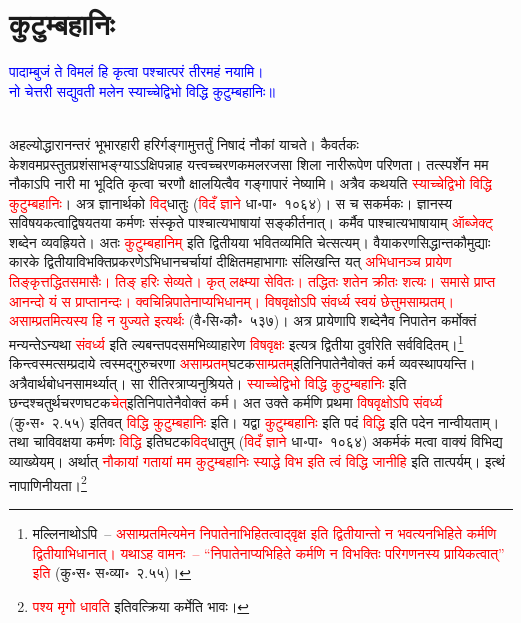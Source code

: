 \section[कुटुम्बहानिः]{कुटुम्बहानिः}
\centering\textcolor{blue}{पादाम्बुजं ते विमलं हि कृत्वा पश्चात्परं तीरमहं नयामि।\nopagebreak\\
नो चेत्तरी सद्युवती मलेन स्याच्चेद्विभो विद्धि कुटुम्बहानिः॥}\nopagebreak\\
\\
\begin{sloppypar}\justifying\noindent\hspace{10mm} अहल्योद्धारानन्तरं भू\-भार\-हारी हरिर्गङ्गामुत्तर्तुं निषादं नौकां याचते। कैवर्तकः केशवमप्रस्तुत\-प्रशंसाभङ्ग्याऽऽक्षिपन्नाह यत्त्वच्चरण\-कमल\-रजसा शिला नारी\-रूपेण परिणता। तत्स्पर्शेन मम नौकाऽपि नारी मा भूदिति कृत्वा चरणौ क्षालयित्वैव गङ्गा\-पारं नेष्यामि। अत्रैव कथयति \textcolor{red}{स्याच्चेद्विभो विद्धि कुटुम्ब\-हानिः}। अत्र ज्ञानार्थको \textcolor{red}{विद्‌}\-धातुः (\textcolor{red}{विदँ ज्ञाने} धा॰पा॰~१०६४)। स च सकर्मकः। ज्ञानस्य सविषयकत्वाद्विषयतया कर्मणः संस्कृते पाश्चात्य\-भाषायां सङ्कीर्तनात्। कर्मैव पाश्चात्य\-भाषायाम् \textcolor{red}{ऑब्जेक्ट्‌} शब्देन व्यवह्रियते। अतः \textcolor{red}{कुटुम्बहानिम्‌} इति द्वितीयया भवितव्यमिति चेत्सत्यम्। वैयाकरण\-सिद्धान्त\-कौमुद्याः कारके द्वितीया\-विभक्ति\-प्रकरणेऽभिधान\-चर्चायां दीक्षित\-महाभागाः संलिखन्ति यत् \textcolor{red}{अभिधानञ्च प्रायेण तिङ्कृत्तद्धित\-समासैः। तिङ् हरिः सेव्यते। कृत् लक्ष्म्या सेवितः। तद्धितः शतेन क्रीतः शत्यः। समासे प्राप्त आनन्दो यं स प्राप्तानन्दः। क्वचिन्निपातेनाप्यभिधानम्। विष\-वृक्षोऽपि संवर्ध्य स्वयं छेत्तुमसाम्प्रतम्। असाम्प्रतमित्यस्य हि न युज्यते इत्यर्थः} (वै॰सि॰कौ॰~५३७)। अत्र प्रायेणापि शब्देनैव निपातेन कर्मोक्तं मन्यन्तेऽन्यथा \textcolor{red}{संवर्ध्य} इति ल्यबन्तपद\-समभिव्याहारेण \textcolor{red}{विष\-वृक्षः} इत्यत्र द्वितीया दुर्वारेति सर्व\-विदितम्।\footnote{मल्लिनाथोऽपि~– \textcolor{red}{असाम्प्रतमित्यमेन निपातेनाभि\-हितत्वाद्‌वृक्ष इति द्वितीयान्तो न भवत्यनभिहिते कर्मणि द्वितीयाभिधानात्। यथाऽह वामनः~– “निपातेनाप्यभिहिते कर्मणि न विभक्तिः परिगणनस्य प्रायिकत्वात्” इति} (कु॰स॰ स॰व्या॰~२.५५)।} किन्त्वस्मत्सम्प्रदाये त्वस्मद्गुरु\-चरणा \textcolor{red}{असाम्प्रतम्‌}\-घटक\-\textcolor{red}{साम्प्रतम्‌}इति\-निपातेनैवोक्तं कर्म व्यवस्थापयन्ति। अत्रैवार्थ\-बोधन\-सामर्थ्यात्। सा रीतिरत्राप्यनु\-श्रियते। \textcolor{red}{स्याच्चेद्विभो विद्धि कुटुम्ब\-हानिः} इति छन्दश्चतुर्थ\-चरण\-घटक\-\textcolor{red}{चेत्‌}\-इति\-निपातेनैवोक्तं कर्म। अत उक्ते कर्मणि प्रथमा \textcolor{red}{विष\-वृक्षोऽपि संवर्ध्य} (कु॰स॰~२.५५) इतिवत् \textcolor{red}{विद्धि कुटुम्ब\-हानिः} इति।
यद्वा \textcolor{red}{कुटुम्ब\-हानिः} इति पदं \textcolor{red}{विद्धि} इति पदेन नान्वीयताम्। तथा चाविवक्षया कर्मणः \textcolor{red}{विद्धि} इति\-घटक\-\textcolor{red}{विद्‌}\-धातुम् (\textcolor{red}{विदँ ज्ञाने} धा॰पा॰~१०६४) अकर्मकं मत्वा वाक्यं विभिद्य व्याख्येयम्। अर्थात् \textcolor{red}{नौकायां गतायां मम कुटुम्ब\-हानिः स्याद्धे विभ इति त्वं विद्धि जानीहि} इति तात्पर्यम्।
इत्थं नापाणिनीयता।\footnote{\textcolor{red}{पश्य मृगो धावति} इतिवत्क्रिया कर्मेति भावः।}\end{sloppypar}
